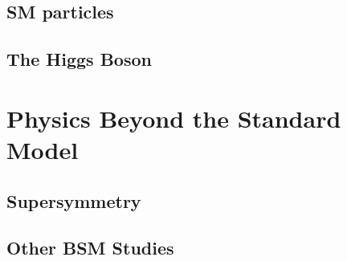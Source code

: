 \subsection{SM particles}
\subsection{The Higgs Boson}
\section{Physics Beyond the Standard Model}
\subsection{Supersymmetry}
\subsection{Other BSM Studies}
